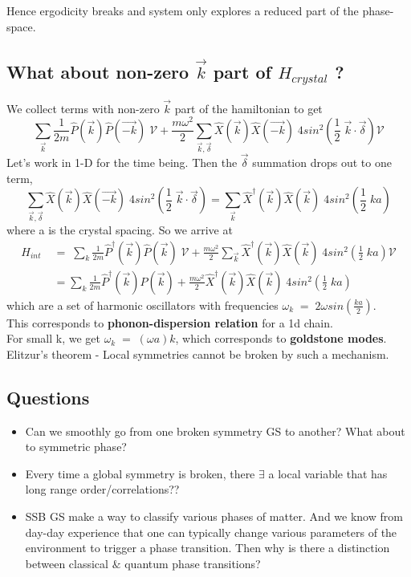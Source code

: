 \documentclass[12pt]{article}
\begin{document}
Hence ergodicity breaks and system only explores a reduced part of the phase-space.
\newpage

\subsection{What about non-zero $\vec{k}$ part of $H_{crystal}$ ?}
We collect terms with non-zero $\vec{k}$ part of the hamiltonian to get
\begin{equation}
    \sum_{\Vec{k}} \frac{1}{2m}\hat{P}(\Vec{k}) \hat{P}(\Vec{-k}) \;\mathcal{V} + \frac{m\omega^2}{2} \sum_{\vec{k}, \vec{\delta}} \hat{X}(\vec{k})\hat{X}(\vec{-k})\; 4sin^2(\frac{1}{2}\;\vec{k}\cdot\vec{\delta}) \mathcal{V}
\end{equation}
Let's work in 1-D for the time being. Then the $\vec{\delta}$ summation drops out to one term,
\begin{equation*}
   \sum_{\vec{k}, \vec{\delta}} \hat{X}(\vec{k})\hat{X}(\vec{-k})\; 4sin^2(\frac{1}{2}\;\vec{k}\cdot\vec{\delta}) = \sum_{\vec{k}} \hat{X}^{\dagger}(\vec{k})\hat{X}(\vec{k})\; 4sin^2(\frac{1}{2}\;ka)
\end{equation*}
where a is the crystal spacing. So we arrive at
\begin{align}
    H_{int}\;&=\;\sum_{{k}} \displaystyle{\frac{1}{2m}}\hat{P}^{\dagger}(\Vec{k}) \hat{P}(\Vec{k}) \;\mathcal{V} + \frac{m\omega^2}{2} \sum_{\vec{k}} \hat{X}^{\dagger}(\vec{k})\hat{X}(\vec{k})\; 4sin^2(\frac{1}{2}\;ka)\mathcal{V}\\
    &= \sum_{{k}}\displaystyle{\frac{1}{2m}}\hat{P}^{\dagger}(\Vec{k}) \hat{P}(\Vec{k}) +  \frac{m\omega^2}{2} \hat{X}^{\dagger}(\vec{k})\hat{X}(\vec{k})\; 4sin^2(\frac{1}{2}\;ka)
\end{align}
which are a set of harmonic oscillators with frequencies $\omega_{k}\;=\;2\omega sin(\displaystyle{\frac{ka}{2}})$. \\
This corresponds to\textbf{ phonon-dispersion relation} for a 1d chain.\\
For small k, we get $\omega_k\;=\;(\omega a)k $, which corresponds to \textbf{goldstone modes}.\\
\newline
Elitzur's theorem - Local symmetries cannot be broken by such a mechanism.

\newpage
\subsection{Questions}

\begin{itemize}
    \item Can we smoothly go from one broken symmetry GS to another? What about to symmetric phase?
    \item Every time a global symmetry is broken, there $\exists$ a local variable that has long range order/correlations??
    \item SSB GS make a way to classify various phases of matter. And we know from day-day experience that one can typically change various parameters of the environment to trigger a phase transition. Then why is there a distinction between classical $\&$ quantum phase transitions?
\end{itemize}
\end{document}
